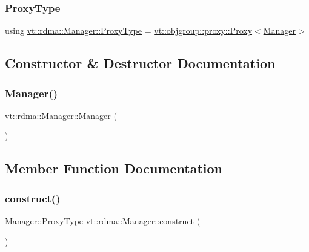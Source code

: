 \subsubsection{\texorpdfstring{Proxy\+Type}{ProxyType}}
{\footnotesize\ttfamily using \hyperlink{structvt_1_1rdma_1_1_manager_a75d5cdc6428ea19f5ec665b04dcd7166}{vt\+::rdma\+::\+Manager\+::\+Proxy\+Type} =  \hyperlink{structvt_1_1objgroup_1_1proxy_1_1_proxy}{vt\+::objgroup\+::proxy\+::\+Proxy}$<$\hyperlink{structvt_1_1rdma_1_1_manager}{Manager}$>$}



\subsection{Constructor \& Destructor Documentation}
\mbox{\label{structvt_1_1rdma_1_1_manager_a8c9850c80d45b15a6b2ca918ef77c0a0}} 
\subsubsection{\texorpdfstring{Manager()}{Manager()}}
{\footnotesize\ttfamily vt\+::rdma\+::\+Manager\+::\+Manager (\begin{DoxyParamCaption}{ }\end{DoxyParamCaption})\hspace{0.3cm}{\ttfamily [default]}}



\subsection{Member Function Documentation}
\mbox{\label{structvt_1_1rdma_1_1_manager_ac9119fca74dae512a87d2af6c03b15ed}} 
\subsubsection{\texorpdfstring{construct()}{construct()}}
{\footnotesize\ttfamily \hyperlink{structvt_1_1rdma_1_1_manager_a75d5cdc6428ea19f5ec665b04dcd7166}{Manager\+::\+Proxy\+Type} vt\+::rdma\+::\+Manager\+::construct (\begin{DoxyParamCaption}{ }\end{DoxyParamCaption})\hspace{0.3cm}{\ttfamily [static]}}

